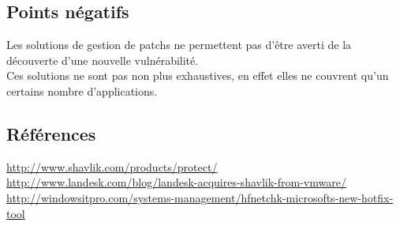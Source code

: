 \subsection{Points négatifs}
Les solutions de gestion de patchs ne permettent pas d’être averti de la découverte d’une nouvelle vulnérabilité.\\

Ces solutions ne sont pas non plus exhaustives, en effet elles ne couvrent qu'un certains nombre d’applications.\\

\subsection{Références}
\small
\noindent
\url{http://www.shavlik.com/products/protect/}\newline
\url{http://www.landesk.com/blog/landesk-acquires-shavlik-from-vmware/}\newline
\url{http://windowsitpro.com/systems-management/hfnetchk-microsofts-new-hotfix-tool}\newline
\normalsize